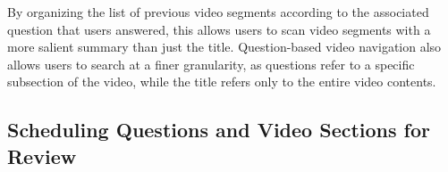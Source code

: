 \documentclass{sigchi}
\begin{document}
By organizing the list of previous video segments according to the associated question that users answered, this allows users to scan video segments with a more salient summary than just the title. Question-based video navigation also allows users to search at a finer granularity, as questions refer to a specific subsection of the video, while the title refers only to the entire video contents.



\subsection{Scheduling Questions and Video Sections for Review}
\end{document}
